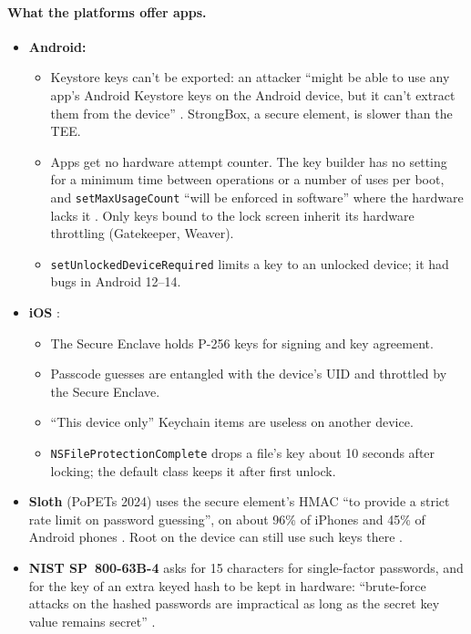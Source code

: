 \documentclass[11pt,a4paper]{article}
\begin{document}
\paragraph{What the platforms offer apps.}
\begin{itemize}
  \item \textbf{Android:}
  \begin{itemize}
    \item Keystore keys can't be exported: an attacker ``might be able to use any app's Android Keystore keys on the Android device, but it can't extract them from the device'' \cite{androidks}. StrongBox, a secure element, is slower than the TEE.
    \item Apps get no hardware attempt counter. The key builder has no setting for a minimum time between operations or a number of uses per boot, and \texttt{setMaxUsageCount} ``will be enforced in software'' where the hardware lacks it \cite{kgps}. Only keys bound to the lock screen inherit its hardware throttling (Gatekeeper, Weaver).
    \item \texttt{setUnlockedDeviceRequired} limits a key to an unlocked device; it had bugs in Android 12--14.
  \end{itemize}
  \item \textbf{iOS} \cite{applesec}:
  \begin{itemize}
    \item The Secure Enclave holds P-256 keys for signing and key agreement.
    \item Passcode guesses are entangled with the device's UID and throttled by the Secure Enclave.
    \item ``This device only'' Keychain items are useless on another device.
    \item \texttt{NSFileProtectionComplete} drops a file's key about 10 seconds after locking; the default class keeps it after first unlock.
  \end{itemize}
  \item \textbf{Sloth} (PoPETs 2024) uses the secure element's HMAC ``to provide a strict rate limit on password guessing'', on about 96\% of iPhones and 45\% of Android phones \cite{sloth}. Root on the device can still use such keys there \cite{keydroid}.
  \item \textbf{NIST SP~800-63B-4} asks for 15 characters for single-factor passwords, and for the key of an extra keyed hash to be kept in hardware: ``brute-force attacks on the hashed passwords are impractical as long as the secret key value remains secret'' \cite{sp80063b}.
\end{itemize}
\end{document}
